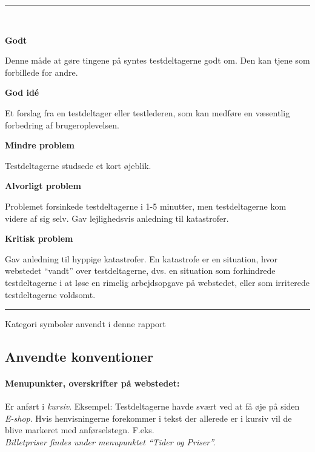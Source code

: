 \documentclass[10pt,a4paper]{article}      %
\newcommand\pic[1]{\texttt{[image: Pics/\#1]}}
\renewcommand\good{\pic{good}}
\renewcommand\goodidea{\pic{goodidea}}
\renewcommand\smallproblem{\pic{smallproblem}}
\renewcommand\seriousproblem{\pic{seriousproblem}}
\renewcommand\criticalproblem{\pic{criticalproblem}}
\begin{document}
\begin{table}[!ht]
\centering
\rule{\linewidth}{\heavyrulewidth}\\[6mm]
\begin{kommentarer}

\item[\good] \textbf{Godt}

Denne måde at gøre tingene på syntes testdeltagerne godt om. Den kan tjene som
forbillede for andre.

\item[\goodidea] \textbf{God idé}

Et forslag fra en testdeltager eller testlederen, som kan medføre en væsentlig
forbedring af brugeroplevelsen.

\item[\smallproblem] \textbf{Mindre problem}

Testdeltagerne studsede et kort øjeblik.

\item[\seriousproblem] \textbf{Alvorligt problem}

Problemet forsinkede testdeltagerne i 1-5 minutter, men testdeltagerne kom
videre af sig selv.  Gav lejlighedsvis anledning til katastrofer.

\item[\criticalproblem] \textbf{Kritisk problem}

Gav anledning til hyppige katastrofer. En katastrofe er en situation, hvor
webstedet ``vandt'' over testdeltagerne, dvs. en situation som forhindrede
testdeltagerne i at løse en rimelig arbejdsopgave på webstedet, eller som
irriterede testdeltagerne voldsomt.

\end{kommentarer}
\rule{\linewidth}{\heavyrulewidth}
\caption{Kategori symboler anvendt i denne rapport}
\label{tab:gt}
\end{table}

\subsection{Anvendte konventioner}

\paragraph{Menupunkter, overskrifter på webstedet:}
Er anført i \emph{kursiv}. Eksempel: Testdeltagerne havde svært ved at få øje på siden \emph{E-shop}.
Hvis henvisningerne forekommer i tekst der allerede er i kursiv vil de blive markeret med anførselstegn. F.eks. \\
\emph{Billetpriser findes under menupunktet ``Tider og Priser''.}
\clearpage
\end{document}
